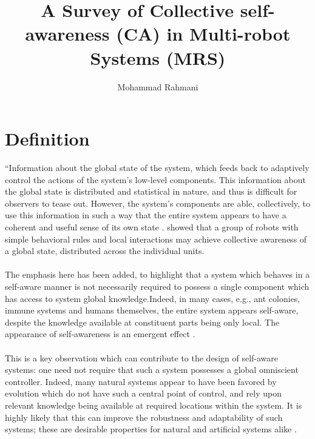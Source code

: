 \documentclass{article}
\begin{document}
	
	\title{A Survey of Collective self-awareness (CA) in Multi-robot Systems (MRS)}
	\author{Mohammad Rahmani}
	\date{}
	\maketitle
	
	\section{Definition}
		“Information about the global state of the system, which feeds back to adaptively control the actions of the system’s low-level components. This information about the global state is distributed and statistical in nature, and thus is difficult for observers to tease out. However, the system’s components are able, collectively, to use this information in such a way that the entire system appears to have a coherent and useful sense of its own state \citep{mitchell-2005-self-awareness-and-control-in-decentralized-systems}. \cite{schmickl-2011-cocoro-the-self-aware-underwater-swarm} showed that a group of robots with simple behavioral rules and local interactions may achieve collective awareness of a global state, distributed across the individual units.
		
		\paragraph{} The emphasis here has been added, to highlight that a system which behaves in a self-aware manner is not necessarily required to possess a single component which has access to system global knowledge.Indeed, in many cases, e.g., ant colonies, immune systems and humans themselves, the entire system appears self-aware, despite the knowledge available at constituent parts being only local. The appearance of self-awareness is an emergent effect \citet{mitchell-2005-self-awareness-and-control-in-decentralized-systems}.
		
		\paragraph{} This is a key observation which can contribute to the design of self-aware systems: one need not require that such a system possesses a global omniscient controller. Indeed, many natural systems appear to have been favored by evolution which do not have such a central point of control, and rely upon relevant knowledge being available at required locations within the system. It is highly likely that this can improve the robustness and adaptability of such systems; these are desirable properties for natural and artificial systems alike \citet{mitchell-2005-self-awareness-and-control-in-decentralized-systems}.
	
\end{document}
